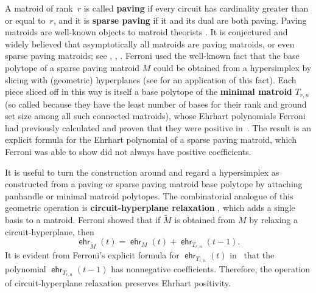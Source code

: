\documentclass[11pt]{amsart}
\theoremstyle{definition}
\newcommand{\0}{\emptyset}
\DeclareMathOperator{\ehr}{\mathsf{ehr}}
\newcommand{\defterm}[1]{\textbf{#1}}
\begin{document}
A matroid of rank~$r$ is called \defterm{paving} if every circuit has cardinality greater than or equal to~$r$, and it is \defterm{sparse paving} if it and its dual are both paving.
Paving matroids are well-known objects to matroid theorists \cite[Chapter 2,3]{Welsh}.
It is conjectured and widely believed that asymptotically all matroids are paving matroids, or even sparse paving matroids; see \cite{mayhew}, \cite{pendavingh-vanderpol}, \cite[Chapter~15.5]{Oxley}.
Ferroni used the well-known fact that the base polytope of a sparse paving matroid $M$ could be obtained from a hypersimplex by slicing with (geometric) hyperplanes (see \cite{HerrmaannJoswig} for an application of this fact). Each piece sliced off in this way is itself a base polytope of the \defterm{minimal matroid} $T_{r,n}$ (so called because they have the least number of bases for their rank and ground set size among all such connected matroids), whose Ehrhart polynomials Ferroni had previously calculated and proven that they were positive in~\cite{Ferroni2021A}.
The result is an explicit formula for the Ehrhart polynomial of a sparse paving matroid, which Ferroni was able to show did not always have positive coefficients.

It is useful to turn the construction around and regard a hypersimplex as constructed from a paving or sparse paving matroid base polytope by attaching panhandle or minimal matroid polytopes.
The combinatorial analogue of this geometric operation is \defterm{circuit-hyperplane relaxation} \cite[p.39]{Oxley}, which adds a single basis to a matroid.
Ferroni\cite[Thm.~1.8]{Ferroni2021A} showed that if $\widetilde{M}$ is obtained from $M$ by relaxing a circuit-hyperplane, then \[\ehr_{\widetilde{M}}(t)=\ehr_M(t)+\ehr_{T_{r,n}}(t-1).\]
It is evident from Ferroni's explicit formula for $\ehr_{T_{r,n}}(t)$ in~\cite{Ferroni2021A} that the polynomial $\ehr_{T_{r,n}}(t-1)$ has nonnegative coefficients. Therefore, the operation of circuit-hyperplane relaxation preserves Ehrhart positivity.
\end{document}
